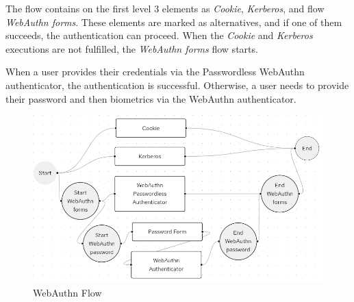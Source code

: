 The flow contains on the first level 3 elements as \textit{Cookie}, \textit{Kerberos}, and flow \textit{WebAuthn forms}.
These elements are marked as alternatives, and if one of them succeeds, the authentication can proceed.
When the \textit{Cookie} and \textit{Kerberos} executions are not fulfilled, the \textit{WebAuthn forms} flow starts.

When a user provides their credentials via the Passwordless WebAuthn authenticator, the authentication is successful.
Otherwise, a user needs to provide their password and then biometrics via the WebAuthn authenticator.

\begin{figure}[htbp]
  \centering
  \includegraphics[width=1\textwidth]{img/flow-new.png}
  \caption{WebAuthn Flow}
  \label{fig:basic-auth-flow}
\end{figure}

\Blindtext